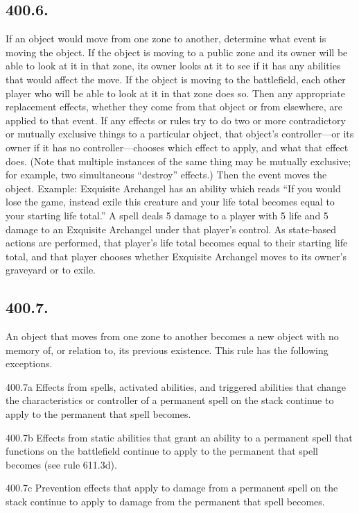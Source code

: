\subsection*{400.6.}
If an object would move from one zone to another, determine what event is moving the object. If the object is moving to a public zone and its owner will be able to look at it in that zone, its owner looks at it to see if it has any abilities that would affect the move. If the object is moving to the battlefield, each other player who will be able to look at it in that zone does so. Then any appropriate replacement effects, whether they come from that object or from elsewhere, are applied to that event. If any effects or rules try to do two or more contradictory or mutually exclusive things to a particular object, that object’s controller—or its owner if it has no controller—chooses which effect to apply, and what that effect does. (Note that multiple instances of the same thing may be mutually exclusive; for example, two simultaneous “destroy” effects.) Then the event moves the object.
Example: Exquisite Archangel has an ability which reads “If you would lose the game, instead exile this creature and your life total becomes equal to your starting life total.” A spell deals 5 damage to a player with 5 life and 5 damage to an Exquisite Archangel under that player’s control. As state-based actions are performed, that player’s life total becomes equal to their starting life total, and that player chooses whether Exquisite Archangel moves to its owner’s graveyard or to exile.

\subsection*{400.7.}
An object that moves from one zone to another becomes a new object with no memory of, or relation to, its previous existence. This rule has the following exceptions.

400.7a Effects from spells, activated abilities, and triggered abilities that change the characteristics or controller of a permanent spell on the stack continue to apply to the permanent that spell becomes.

400.7b Effects from static abilities that grant an ability to a permanent spell that functions on the battlefield continue to apply to the permanent that spell becomes (see rule 611.3d).

400.7c Prevention effects that apply to damage from a permanent spell on the stack continue to apply to damage from the permanent that spell becomes.

